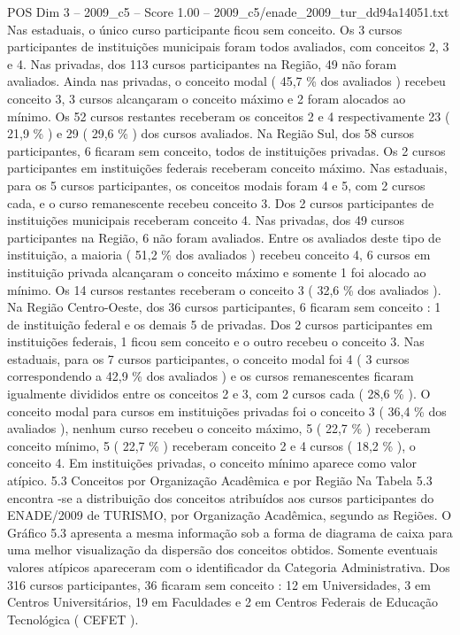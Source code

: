 \begin{textsample}{POS Dim 3 – 2009\_c5 – Score 1.00 – 2009\_c5/enade\_2009\_tur\_dd94a14051.txt}
Nas estaduais, o único curso participante ficou sem conceito.
Os 3 cursos participantes de instituições municipais foram todos avaliados, com conceitos 2, 3 e 4.
Nas privadas, dos 113 cursos participantes na Região, 49 não foram avaliados.
Ainda nas privadas, o conceito modal ( 45,7 \% dos avaliados ) recebeu conceito 3, 3 cursos alcançaram o conceito máximo e 2 foram alocados ao mínimo.
Os 52 cursos restantes receberam os conceitos 2 e 4 respectivamente 23 ( 21,9 \% ) e 29 ( 29,6 \% ) dos cursos avaliados.
Na Região Sul, dos 58 cursos participantes, 6 ficaram sem conceito, todos de instituições privadas.
Os 2 cursos participantes em instituições federais receberam conceito máximo.
Nas estaduais, para os 5 cursos participantes, os conceitos modais foram 4 e 5, com 2 cursos cada, e o curso remanescente recebeu conceito 3.
Dos 2 cursos participantes de instituições municipais receberam conceito 4.
Nas privadas, dos 49 cursos participantes na Região, 6 não foram avaliados.
Entre os avaliados deste tipo de instituição, a maioria ( 51,2 \% dos avaliados ) recebeu conceito 4, 6 cursos em instituição privada alcançaram o conceito máximo e somente 1 foi alocado ao mínimo.
Os 14 cursos restantes receberam o conceito 3 ( 32,6 \% dos avaliados ).
Na Região Centro-Oeste, dos 36 cursos participantes, 6 ficaram sem conceito : 1 de instituição federal e os demais 5 de privadas.
Dos 2 cursos participantes em instituições federais, 1 ficou sem conceito e o outro recebeu o conceito 3.
Nas estaduais, para os 7 cursos participantes, o conceito modal foi 4 ( 3 cursos correspondendo a 42,9 \% dos avaliados ) e os cursos remanescentes ficaram igualmente divididos entre os conceitos 2 e 3, com 2 cursos cada ( 28,6 \% ).
O conceito modal para cursos em instituições privadas foi o conceito 3 ( 36,4 \% dos avaliados ), nenhum curso recebeu o conceito máximo, 5 ( 22,7 \% ) receberam conceito mínimo, 5 ( 22,7 \% ) receberam conceito 2 e 4 cursos ( 18,2 \% ), o conceito 4.
Em instituições privadas, o conceito mínimo aparece como valor atípico. 5.3 Conceitos por Organização Acadêmica e por Região Na Tabela 5.3 encontra -se a distribuição dos conceitos atribuídos aos cursos participantes do ENADE/2009 de TURISMO, por Organização Acadêmica, segundo as Regiões.
O Gráfico 5.3 apresenta a mesma informação sob a forma de diagrama de caixa para uma melhor visualização da dispersão dos conceitos obtidos.
Somente eventuais valores atípicos apareceram com o identificador da Categoria Administrativa.
Dos 316 cursos participantes, 36 ficaram sem conceito : 12 em Universidades, 3 em Centros Universitários, 19 em Faculdades e 2 em Centros Federais de Educação Tecnológica ( CEFET ).

\end{textsample}
